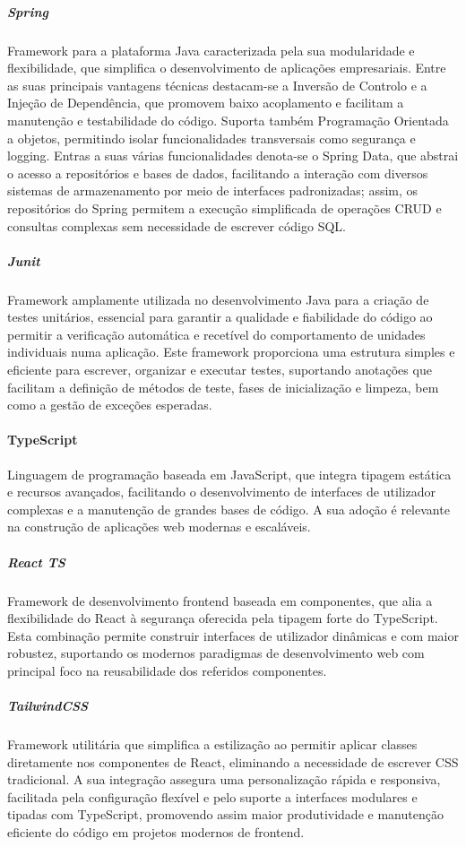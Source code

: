 \subparagraph{Spring} Framework para a plataforma Java caracterizada pela sua modularidade e flexibilidade, que simplifica o desenvolvimento de aplicações empresariais. Entre as suas principais vantagens técnicas destacam-se a Inversão de Controlo e a Injeção de Dependência, que promovem baixo acoplamento e facilitam a manutenção e testabilidade do código. Suporta também Programação Orientada a objetos, permitindo isolar funcionalidades transversais como segurança e logging. Entras a suas várias funcionalidades denota-se o Spring Data, que abstrai o acesso a repositórios e bases de dados, facilitando a interação com diversos sistemas de armazenamento por meio de interfaces padronizadas; assim, os repositórios do Spring permitem a execução simplificada de operações CRUD e consultas complexas sem necessidade de escrever código SQL.

\subparagraph{Junit} Framework amplamente utilizada no desenvolvimento Java para a criação de testes unitários, essencial para garantir a qualidade e fiabilidade do código ao permitir a verificação automática e recetível do comportamento de unidades individuais numa aplicação. Este framework proporciona uma estrutura simples e eficiente para escrever, organizar e executar testes, suportando anotações que facilitam a definição de métodos de teste, fases de inicialização e limpeza, bem como a gestão de exceções esperadas.

\paragraph{TypeScript} Linguagem de programação baseada em JavaScript, que integra tipagem estática e recursos avançados, facilitando o desenvolvimento de interfaces de utilizador complexas e a manutenção de grandes bases de código. A sua adoção é relevante na construção de aplicações web modernas e escaláveis.

\subparagraph{React TS} Framework de desenvolvimento frontend baseada em componentes, que alia a flexibilidade do React à segurança oferecida pela tipagem forte do TypeScript. Esta combinação permite construir interfaces de utilizador dinâmicas e com maior robustez, suportando os modernos paradigmas de desenvolvimento web com principal foco na reusabilidade dos referidos componentes.

\subparagraph{TailwindCSS} Framework utilitária que simplifica a estilização ao permitir aplicar classes diretamente nos componentes de React, eliminando a necessidade de escrever CSS tradicional. A sua integração assegura uma personalização rápida e responsiva, facilitada pela configuração flexível e pelo suporte a interfaces modulares e tipadas com TypeScript, promovendo assim maior produtividade e manutenção eficiente do código em projetos modernos de frontend.

